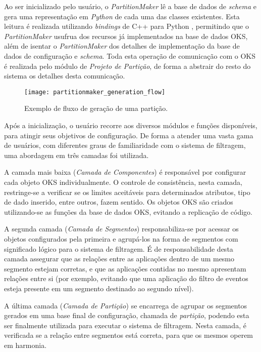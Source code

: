 Ao ser inicializado pelo usuário, o \emph{PartitionMaker} lê a base de dados de \emph{schema} e gera uma representação em \emph{Python} \cite{bib:python} de cada uma das classes existentes. Esta leitura é realizada utilizando \emph{bindings} de C++ para Python \cite{bib:boost}, permitindo que o \emph{PartitionMaker} usufrua dos recursos já implementados na base de dados OKS, além de isentar o \emph{PartitionMaker} dos detalhes de implementação da base de dados de configuração e \emph{schema}. Toda esta operação de comunicação com o OKS é realizada pelo módulo de  \emph{Projeto de Partição}, de forma a abstrair do resto do sistema os detalhes desta comunicação.

\begin{figure}[t]
\begin{center}
\texttt{[image: partitionmaker\_generation\_flow]}
\caption{Exemplo de fluxo de geração de uma partição.}
\label{fig:pm_flow}
\end{center}
\end{figure}

Após a inicialização, o usuário recorre aos diversos módulos e funções disponíveis, para atingir seus objetivos de configuração. De forma a atender uma vasta gama de usuários, com diferentes graus de familiaridade com o sistema de filtragem, uma abordagem em três camadas foi utilizada.

A camada mais baixa (\emph{Camada de Componentes}) é responsável por configurar cada objeto OKS individualmente. O controle de consistência, nesta camada, restringe-se a verificar se os limites aceitáveis para determinados atributos, tipo de dado inserido, entre outros, fazem sentido. Os objetos OKS são criados utilizando-se as funções da  base de dados OKS, evitando a replicação de código.

A segunda camada (\emph{Camada de Segmentos}) responsabiliza-se por acessar os objetos configurados pela primeira e agrupá-los na forma de segmentos com significado lógico para o sistema de filtragem. É de responsabilidade desta camada assegurar que as relações entre as aplicações dentro de um mesmo segmento estejam corretas, e que as aplicações contidas no mesmo apresentam relações entre si (por exemplo, evitando que uma aplicação do filtro de eventos esteja presente em um segmento destinado ao segundo nível). 

A última camada (\emph{Camada de Partição}) se encarrega de agrupar os segmentos gerados em uma base final de configuração, chamada de \emph{partição}, podendo esta ser finalmente utilizada para executar o sistema de filtragem. Nesta camada, é verificada se a relação entre segmentos está correta, para que os mesmos operem em harmonia.

